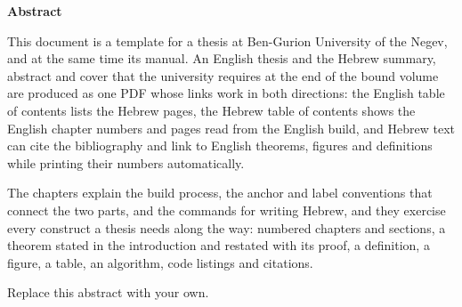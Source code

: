 \thispagestyle{plain}
{\noindent\Large\textbf{Abstract}}

\vspace{3ex}

This document is a template for a thesis at Ben-Gurion University of the Negev, and at the same time its manual.
An English thesis and the Hebrew summary, abstract and cover that the university requires at the end of the bound volume are produced as one PDF whose links work in both directions: the English table of contents lists the Hebrew pages, the Hebrew table of contents shows the English chapter numbers and pages read from the English build, and Hebrew text can cite the bibliography and link to English theorems, figures and definitions while printing their numbers automatically.

The chapters explain the build process, the anchor and label conventions that connect the two parts, and the commands for writing Hebrew, and they exercise every construct a thesis needs along the way: numbered chapters and sections, a theorem stated in the introduction and restated with its proof, a definition, a figure, a table, an algorithm, code listings and citations.

Replace this abstract with your own.
